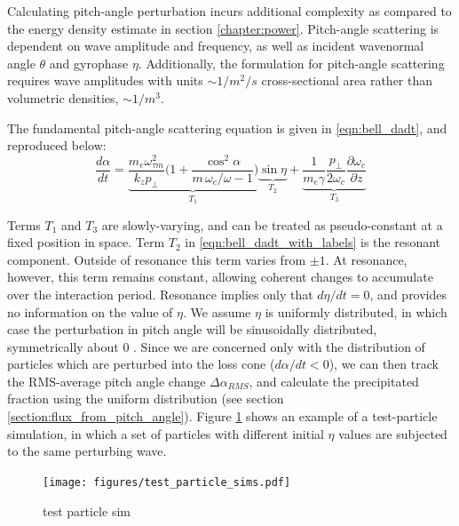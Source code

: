 Calculating pitch-angle perturbation incurs additional complexity as compared to the energy density estimate in section \ref{chapter:power}. Pitch-angle scattering is dependent on wave amplitude and frequency, as well as incident wavenormal angle $\theta$ and gyrophase $\eta$. Additionally, the formulation for pitch-angle scattering requires wave amplitudes with units $\sim 1/m^2/s$ cross-sectional area rather than volumetric densities, $\sim 1/m^3$.

The fundamental pitch-angle scattering equation is given in \eqref{eqn:bell_dadt}, and reproduced below:
\begin{equation}
\frac{d\alpha}{dt} = \underbrace{\frac{m_e \omega_{\tau m}^2}{k_z p_\perp} \bigg( 1 + \frac{\cos^2\alpha}{m\,\omega_c / \omega - 1}\bigg)}_{T_1}\underbrace{\sin \eta}_{T_2} + \underbrace{\frac{1}{m_e \gamma}\frac{p_\perp}{2 \omega_c}\frac{\partial \omega_c}{\partial z}}_{T_3}
\label{eqn:bell_dadt_with_labels}
\end{equation}

Terms $T_1$ and $T_3$ are slowly-varying, and can be treated as pseudo-constant at a fixed position in space. Term $T_2$ in \eqref{eqn:bell_dadt_with_labels} is the resonant component. Outside of resonance this term varies from $\pm 1$. At resonance, however, this term remains constant, allowing coherent changes to accumulate over the interaction period. Resonance implies only that $d\eta/dt = 0$, and provides no information on the value of $\eta$. We assume $\eta$ is uniformly distributed, in which case the perturbation in pitch angle will be sinusoidally distributed, symmetrically about 0 \citep{Inan1977}. Since we are concerned only with the distribution of particles which are perturbed into the loss cone ($d\alpha/dt < 0$), we can then track the RMS-average pitch angle change $\Delta \alpha_{RMS}$, and calculate the precipitated fraction using the uniform distribution (see section \ref{section:flux_from_pitch_angle}).
Figure \ref{fig:test_particle_sims} shows an example of a test-particle simulation, in which a set of particles with different initial $\eta$ values are subjected to the same perturbing wave.

\begin{figure}[h]
\begin{center}
\texttt{[image: figures/test\_particle\_sims.pdf]}
\caption{test particle sim}
\label{fig:test_particle_sims}
\end{center}
\end{figure}

